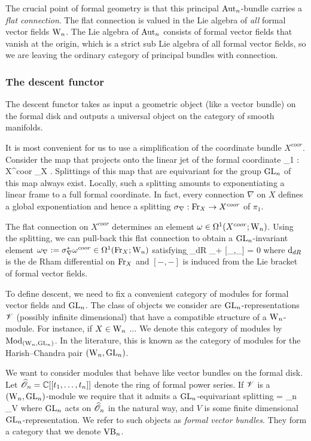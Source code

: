 The crucial point of formal geometry is that this principal ${\rm Aut}_n$-bundle carries a {\em flat connection}. 
The flat connection is valued in the Lie algebra of {\em all} formal vector fields ${{\rm W}_n}$.	
The Lie algebra of ${\rm Aut}_n$ consists of formal vector fields that vanish at the origin, which is a strict sub Lie algebra of all formal vector fields, so we are leaving the ordinary category of principal bundles with connection. 

\subsubsection{The descent functor}

The descent functor takes as input a geometric object (like a vector bundle) on the formal disk and outputs a universal object on the category of smooth manifolds. 

It is most convenient for us to use a simplification of the coordinate bundle $X^{coor}$. 
Consider the map that projects onto the linear jet of the formal coordinate
\ben
\pi_1 : X^{coor} \to \Fr_X .
\een
Splittings of this map that are equivariant for the group ${\rm GL}_n$ of this map always exist. 
Locally, such a splitting amounts to exponentiating a linear frame to a full formal coordinate.
In fact, every  connection $\nabla$ on $X$ defines a global exponentiation and hence a splitting $\sigma_\nabla : {\rm Fr}_X \to X^{coor}$ of $\pi_1$. 

The flat connection on $X^{coor}$ determines an element $\omega \in \Omega^1(X^{coor} ; {{\rm W}_n})$. 
Using the splitting, we can pull-back this flat connection to obtain a ${\rm GL}_n$-invariant element $\omega_\nabla := \sigma_\nabla^* \omega^{coor} \in \Omega^1({\rm Fr}_X ; {{\rm W}_n})$ satisfying 
\ben
\d_{dR} \omega_\nabla + [\omega_\nabla,\omega_\nabla] = 0
\een
where ${\rm d}_{dR}$ is the de Rham differential on ${\rm Fr}_X$ and $[-,-]$ is induced from the Lie bracket of formal vector fields.

To define descent, we need to fix a convenient category of modules for formal vector fields and ${\rm GL}_n$.
The class of objects we consider are ${\rm GL}_n$-representations $\mathscr V$ (possibly infinite dimensional) that have a compatible structure of a ${{\rm W}_n}$-module. 
For instance, if $X \in {{\rm W}_n}$ ...
We denote this category of modules by ${\rm Mod}_{({{\rm W}_n}, {\rm GL}_n)}$. 
In the literature, this is known as the category of modules for the Harish--Chandra pair $({{\rm W}_n}, {\rm GL}_n)$. 

We want to consider modules that behave like vector bundles on the formal disk. 
Let $\widehat{\mathscr O}_n = \mathbb C[[t_1,\ldots,t_n]]$ denote the ring of formal power series.
If $\mathscr V$ is a $({{\rm W}_n}, {\rm GL}_n)$-module we require that it admits a ${\rm GL}_n$-equivariant splitting
\ben
\sV = \hO_n \tensor_\CC V
\een
where ${\rm GL}_n$ acts on $\widehat{\mathscr O}_n$ in the natural way, and $V$ is some finite dimensional ${\rm GL}_n$-representation. 
We refer to such objects as {\em formal vector bundles}. 
They form a category that we denote ${\rm VB}_n$. 

